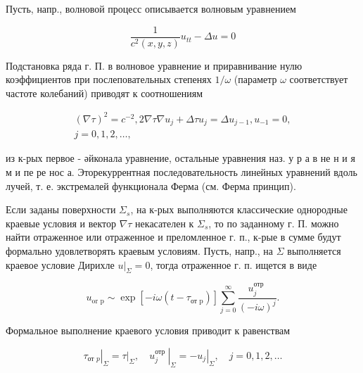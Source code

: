 \documentclass[10pt]{article}
\begin{document}
Пусть, напр., волновой процесс описывается волновым уравнением



\[

\frac{1}{c^{2}(x, y, z)} u_{t t}-\Delta u=0

\]



Подстановка ряда г. П. в волновое уравнение и приравнивание нулю коэффициентов при послеповательных степенях $1 / \omega$ (параметр $\omega$ соответствует частоте колебаний) приводят к соотношениям



\[

\begin{gathered}

(\nabla \tau)^{2}=c^{-2}, 2 \nabla \tau \nabla u_{j}+\Delta \tau u_{j}=\Delta u_{j-1}, u_{-1}=0, \\

j=0,1,2, \ldots,

\end{gathered}

\]



из к-рых первое - әйконала уравнение, остальные уравнения наз. у р а в не н и я м и пе ре нос а. Эторекуррентная последовательность линейных уравнений вдоль лучей, т. е. экстремалей функционала Ферма (см. Ферма принцип).



Если заданы поверхности $\Sigma_{s}$, на к-рых выполняются классические однородные краевые условия и вектор $\nabla \tau$ некасателен к $\Sigma_{s}$, то по заданному г. П. можно найти отраженное или отраженное и преломленное г. п., к-рые в сумме будут формально удовлетворять краевым условиям. Пусть, напр., на $\Sigma$ выполняется краевое условие Дирихле $\left.u\right|_{\Sigma}=0$, тогда отраженное г. п. ищется в виде



\[

u_{\text {or } \mathrm{p}} \sim \exp \left[-i \omega\left(t-\tau_{\text {от } \mathrm{p}}\right)\right] \sum_{j=0}^{\infty} \frac{u_{j}^{\text {отр }}}{(-i \omega)^{j}} .

\]



Формальное выполнение краевого условия приводит к равенствам



\[

\left.\tau_{\text {от } p}\right|_{\Sigma}=\left.\tau\right|_{\Sigma},\left.\quad u_{j}^{\text {отр }}\right|_{\Sigma}=-\left.u_{j}\right|_{\Sigma}, \quad j=0,1,2, \ldots

\]
\end{document}
